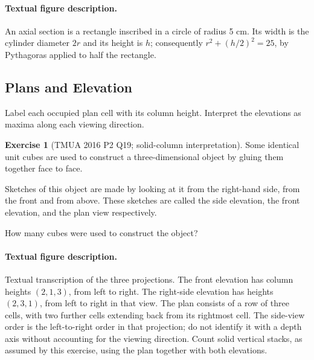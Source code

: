 \documentclass[11pt]{article}
\theoremstyle{definition}
\newtheorem{example}[theorem]{Exercise}
\theoremstyle{remark}
\begin{document}
\paragraph{Textual figure description.}\label{fig:tmua-2016-p1-q12}
An axial section is a rectangle inscribed in a circle of radius 5 cm. Its width is the cylinder diameter \(2r\) and its height is \(h\); consequently \(r^2+(h/2)^2=25\), by Pythagoras applied to half the rectangle.


\subsection{Plans and Elevation}\label{tmua-3-subsection-012}

Label each occupied plan cell with its column height. Interpret the elevations as maxima along each viewing direction.

\begin{example}[TMUA 2016 P2 Q19; solid-column interpretation]\label{tmua-3-unit-023}
    Some identical unit cubes are used to construct a three-dimensional object by gluing them together face to face.

    Sketches of this object are made by looking at it from the right-hand side, from the front and from above. These sketches are called the side elevation, the front elevation, and the plan view respectively.

    How many cubes were used to construct the object?
\end{example}

\paragraph{Textual figure description.}\label{fig:tmua-2016-p2-q19}
Textual transcription of the three projections. The front elevation has column heights \((2,1,3)\), from left to right. The right-side elevation has heights \((2,3,1)\), from left to right in that view. The plan consists of a row of three cells, with two further cells extending back from its rightmost cell. The side-view order is the left-to-right order in that projection; do not identify it with a depth axis without accounting for the viewing direction. Count solid vertical stacks, as assumed by this exercise, using the plan together with both elevations.
\end{document}
